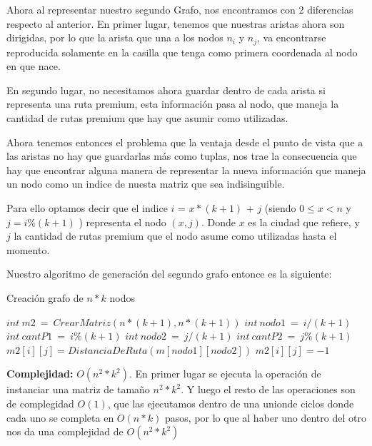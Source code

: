 \documentclass{article}
\begin{document}
\par{Ahora al representar nuestro segundo Grafo, nos encontramos con 2 diferencias respecto al anterior. En primer lugar, tenemos que nuestras aristas ahora son dirigidas, por lo que la arista que una a los nodos $n_{i}$ y $n_{j}$, va encontrarse reproducida solamente en la casilla que tenga como primera coordenada al nodo en que nace.}
\par{En segundo lugar, no necesitamos ahora guardar dentro de cada arista si representa una ruta premium, esta información pasa al nodo, que maneja la cantidad de rutas premium que hay que asumir como utilizadas.}
\medskip
\par{ Ahora tenemos entonces el problema que la ventaja desde el punto de vista que a las aristas no hay que guardarlas más como tuplas, nos trae la consecuencia que hay que encontrar alguna manera de representar la nueva información que maneja un nodo como un indice de nuesta matriz que sea indisinguible.}
\par{Para ello optamos decir que el indice $i$ = $x*(k+1)$ + $j$ (siendo $ 0\leq x < n $ y $j = i \% (k+1)$ ) representa el nodo $(x,j)$. Donde $x$ es la ciudad que refiere, y $j$ la cantidad de rutas premium que el nodo asume como utilizadas hasta el momento.}
\medskip
\par{Nuestro algoritmo de generación del segundo grafo entonce es la siguiente:}
\medskip
\begin{algorithm}[h!]
  \caption{Creación grafo de $n*k$ nodos}
  \begin{algorithmic}
 	\State $int\ m2\ = \ CrearMatriz(n*(k+1), n*(k+1))$  
 	\For {$i \ \in \ [0,..,n*k+1)$} 		
		\State $int\ nodo1\ =\ i/(k+1)$  	
		\State $int\ cantP1\ =\ i\%(k+1)$ 
		\For {$j\ \in\ [0,..,n*(k+1))$}		
			\State $int\ nodo2\ =\ j/(k+1)$ 	 
			\State $int\ cantP2\ =\ j \% (k+1)$
			  
				\State $m2[i][j]= DistanciaDeRuta(m[nodo1][nodo2])$  
			\Else
				\State $m2[i][j] = -1$			\\ 				
			\EndIf
		\EndFor
 	\EndFor
  \end{algorithmic}
  \medskip
  \medskip
  \par{\textbf{Complejidad:} $O(n^2*k^2)$. En primer lugar se ejecuta la operación de instanciar una matriz de tamaño $n^2*k^2$. Y luego el resto de las operaciones son de complegidad $O(1)$, que las ejecutamos dentro de una unionde ciclos donde cada uno se completa en $O(n*k)$ pasos, por lo que al haber uno dentro del otro nos da una complejidad de $O(n^2*k^2)$} 

\end{algorithm}
\medskip
\end{document}
